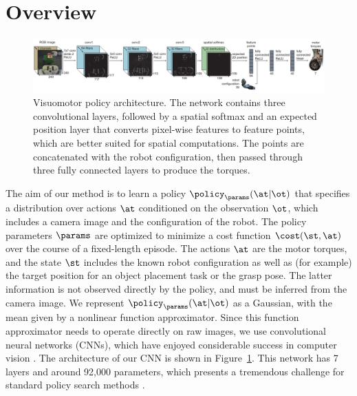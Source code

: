 \documentclass[conference]{IEEEtran}
\begin{document}


\section{Overview}
\label{sec:overview}

\begin{figure}[t]
\centering
\includegraphics[width=\textwidth]{imgs/network_diagram.pdf}
\vspace{-0.3in}
\caption{Visuomotor policy architecture. The network contains three convolutional layers, followed by a spatial softmax and an expected position layer that converts pixel-wise features to feature points, which are better suited for spatial computations. The points are concatenated with the robot configuration, then passed through three fully connected layers to produce the torques.
}
\vspace{-0.15in}
\label{fig:nn}
\end{figure}

The aim of our method is to learn a policy $\policy_\params(\at|\ot)$ that specifies a distribution over actions $\at$ conditioned on the observation $\ot$, which includes a camera image and the configuration of the robot. The policy parameters $\params$ are optimized to minimize a cost function $\cost(\st,\at)$ over the course of a fixed-length episode. The actions $\at$ are the motor torques, and the state $\st$ includes the known robot configuration as well as (for example) the target position for an object placement task or the grasp pose. The latter information is not observed directly by the policy, and must be inferred from the camera image. We represent $\policy_\params(\at|\ot)$ as a Gaussian, with the mean given by a nonlinear function approximator. Since this function approximator needs to operate directly on raw images, we use convolutional neural networks (CNNs), which have enjoyed considerable success in computer vision \cite{ksh-incdc-12}. The architecture of our CNN is shown in Figure~\ref{fig:nn}. This network has 7 layers and around 92,000 parameters, which presents a tremendous challenge for standard policy search methods \cite{dnp-spsr-13}.
\end{document}
